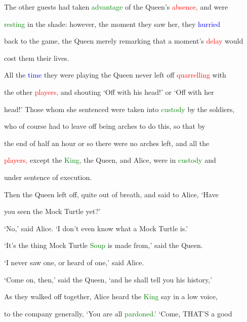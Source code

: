  The other guests had taken \textcolor{green}{advantage} of the Queen’s \textcolor{red}{absence,} and were

 \textcolor{green}{resting} in the shade: however, the moment they saw her, they \textcolor{blue}{hurried}

 back to the game, the Queen merely remarking that a moment’s \textcolor{red}{delay} would

 cost them their lives.



 All the \textcolor{blue}{time} they were playing the Queen never left off \textcolor{red}{quarrelling} with

 the other \textcolor{red}{players,} and \textcolor{BurntOrange}{shouting} ‘Off with his head!’ or ‘Off with her

 head!’ Those whom she \textcolor{BurntOrange}{sentenced} were taken into \textcolor{green}{custody} by the \textcolor{BurntOrange}{soldiers,}

 who of course had to \textcolor{BurntOrange}{leave} off being arches to do this, so that by

 the end of half an hour or so there were no arches left, and all the

 \textcolor{red}{players,} except the \textcolor{green}{King,} the Queen, and Alice, were in \textcolor{green}{custody} and

 under \textcolor{BurntOrange}{sentence} of \textcolor{BurntOrange}{execution.}



 Then the Queen left off, quite out of breath, and said to Alice, ‘Have

 you seen the Mock Turtle yet?’



 ‘No,’ said Alice. ‘I don’t even know what a Mock Turtle is.’



 ‘It’s the thing Mock Turtle \textcolor{green}{Soup} is made from,’ said the Queen.



 ‘I never saw one, or heard of one,’ said Alice.



 ‘Come on, then,’ said the Queen, ‘and he shall tell you his history,’



 As they walked off together, Alice heard the \textcolor{green}{King} say in a low voice,

 to the company generally, ‘You are all \textcolor{green}{pardoned.’} ‘Come, THAT’S a \textcolor{BurntOrange}{good}

